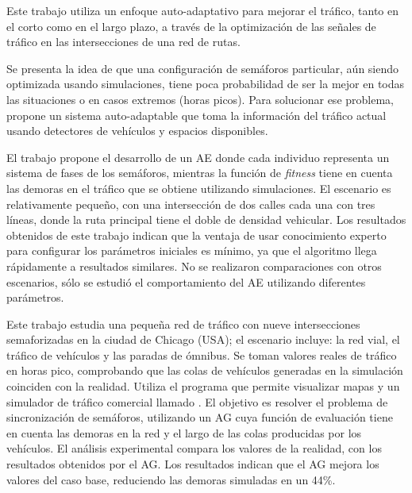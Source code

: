 \begin{itemize}
\begin{item}
\end{item}	


\begin{item}

Este trabajo utiliza un enfoque auto-adaptativo para mejorar el tráfico, tanto en el corto como en el largo plazo, a través de la optimización de las señales de tráfico en las intersecciones de una red de rutas. 

Se presenta la idea de que una configuración de semáforos particular, aún siendo optimizada usando simulaciones, tiene poca probabilidad de ser la mejor en todas las situaciones o en casos extremos (horas picos). Para solucionar ese problema, propone un sistema auto-adaptable que toma la información del tráfico actual usando detectores de vehículos y espacios disponibles.

El trabajo propone el desarrollo de un AE donde cada individuo representa un sistema de fases de los semáforos, mientras la función de \emph{fitness} tiene en cuenta las demoras en el tráfico que se obtiene utilizando simulaciones. El escenario es relativamente pequeño, con una intersección de dos calles cada una con tres líneas, donde la ruta principal tiene el doble de densidad vehicular. Los resultados obtenidos de este trabajo indican que la ventaja de usar conocimiento experto para configurar los parámetros iniciales es mínimo, ya que el algoritmo llega rápidamente a resultados similares. No se realizaron comparaciones con otros escenarios, sólo se estudió el comportamiento del AE utilizando diferentes parámetros.

\end{item}	

\begin{item}

Este trabajo estudia una pequeña red de tráfico con nueve intersecciones semaforizadas en la ciudad de Chicago (USA); el escenario incluye: la red vial, el tráfico de vehículos y las paradas de ómnibus. Se toman valores reales de tráfico en horas pico, comprobando que las colas de vehículos generadas en la simulación coinciden con la realidad. Utiliza el programa \citet{TRANSYT-7F} que permite visualizar mapas y un simulador de tráfico comercial llamado \citet{CORSIM}. El objetivo es resolver el problema de sincronización de semáforos, utilizando un AG cuya función de evaluación tiene en cuenta las demoras en la red y el largo de las colas producidas por los vehículos. El análisis experimental compara los valores de la realidad, con los resultados obtenidos por el AG. Los resultados indican que el AG mejora los valores del caso base, reduciendo las demoras simuladas en un 44\%.

\end{item}	
	
\end{itemize}


